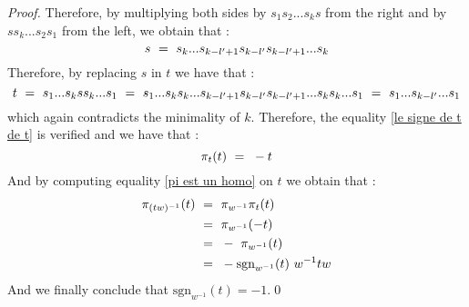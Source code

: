 \begin{proof}
	Therefore, by multiplying both sides by $s_1s_2...s_ks$ from the right and by $ss_k...s_2s_1$ from the left, we obtain that :
	\begin{equation}
	s\text{ }=\text{ } s_k...s_{k-l'+1}s_{k-l'}s_{k-l'+1}...s_k
	\end{equation}
	Therefore, by replacing $s$ in $t$ we have that :
	\begin{equation}
	t\text{ }=\text{ } s_1...s_kss_k...s_1\text{ }=\text{ } s_1...s_ks_k...s_{k-l'+1}s_{k-l'}s_{k-l'+1}...s_ks_k...s_1\text{ }=\text{ } s_1...s_{k-l'}...s_1
	\end{equation}
	which again contradicts the minimality of $k$. Therefore, the equality \eqref{le signe de t de t} is verified and we have that :
	\begin{equation}
	\pi_t(t)\text{ }=\text{ } -t
	\end{equation}
	And by computing equality \eqref{pi est un homo} on $t$ we obtain that :
	\begin{equation}
	\begin{split}
	\pi_{(tw)^{-1}}(t)\text{ }&=\text{ } \pi_{w^{-1}}\pi_t(t)\text{ }\\
	&=\text{ } \pi_{w^{-1}}(-t)\text{ }\\
	&=\text{ } -\text{ } \pi_{w^{-1}}(t)\\
	&=\text{ } -\mbox{sgn}_{w^{-1}}(t)\text{ } w^{-1}tw
	\end{split}
	\end{equation}
	And we finally conclude that $\mbox{sgn}_{w^{-1}}(t)=-1$.\qed
\end{proof}

